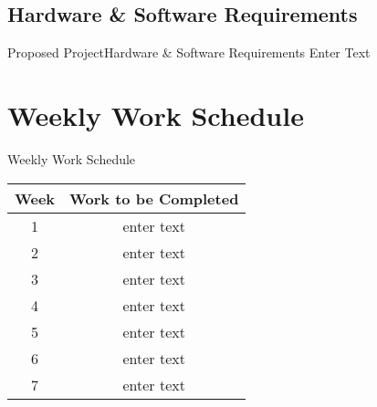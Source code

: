\documentclass[default]{beamer}
\begin{document}
	\subsection{Hardware \& Software Requirements}						
		\begin{frame}{Proposed Project}{Hardware \& Software Requirements} 
		Enter Text
		\end{frame}
	
	\section{Weekly Work Schedule}
		\begin{frame}{Weekly Work Schedule}

		\begin{center}
		\begin{tabular}{|c|c|}
		\hline
		Week & Work to be Completed\\
		\hline
		1 & enter text\\
		\hline
		2 & enter text\\
		\hline
		3 & enter text\\
		\hline
		4 & enter text\\
		\hline
		5 & enter text\\
		\hline
		6 & enter text\\
		\hline
		7 & enter text\\
		\hline
		\end{tabular}				
		\end{center}				
		\end{frame}			
\end{document}
